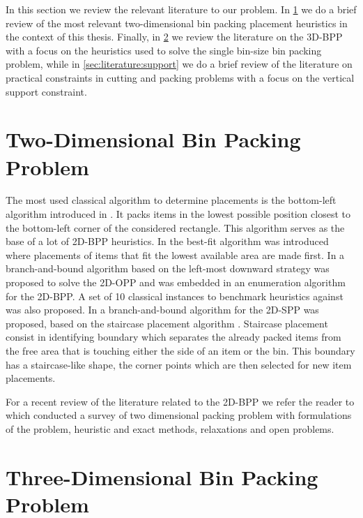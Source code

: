 In this section we review the relevant literature to our problem. 
In \cref{sec:literature:2dbpp} we do a brief review of the most relevant two-dimensional bin packing placement heuristics in the context of this thesis.
Finally, in \cref{sec:literature:3dbpp} we review the literature on the 3D-BPP with a focus on the heuristics used to solve the single bin-size bin packing problem, while in \cref{sec:literature:support} we do a brief review of the literature on practical constraints in cutting and packing problems with a focus on the vertical support constraint.

\section{Two-Dimensional Bin Packing Problem}
\label{sec:literature:2dbpp}%

The most used classical algorithm to determine placements is the bottom-left algorithm introduced in \citep{Baker1980}. 
It packs items in the lowest possible position closest to the bottom-left corner of the considered rectangle. 
This algorithm serves as the base of a lot of 2D-BPP heuristics.
In \citep{burke2004new} the best-fit algorithm was introduced where placements of items that fit the lowest available area are made first.
In \citep{Martello1998} a branch-and-bound algorithm based on the left-most downward strategy was proposed to solve the 2D-OPP and was embedded in an enumeration algorithm for the 2D-BPP.
A set of 10 classical instances to benchmark heuristics against was also proposed.
In \citep{martello2003exact} a branch-and-bound algorithm for the 2D-SPP was proposed, based on the staircase placement algorithm \citep{scheithauer1995equivalence}.
Staircase placement consist in identifying boundary which separates the already packed items from the free area that is touching either the side of an item or the bin. This boundary has a staircase-like shape, the corner points which are then selected for new item placements.

For a recent review of the literature related to the 2D-BPP we refer the reader to \citep{IORI2021399} which conducted a survey of two dimensional packing problem with formulations of the problem, heuristic and exact methods, relaxations and open problems.

\section{Three-Dimensional Bin Packing Problem}
\label{sec:literature:3dbpp}%

